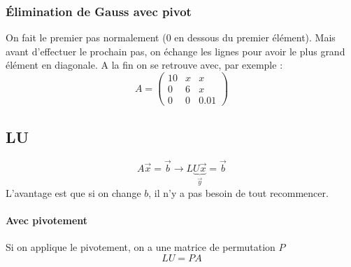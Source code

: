 \documentclass[resume]{subfiles}
\begin{document}
\subsubsection{Élimination de Gauss avec pivot}
On fait le premier pas normalement (0 en dessous du premier élément). Mais avant d'effectuer le prochain pas, on échange les lignes pour avoir le plus grand élément en diagonale. A la fin on se retrouve avec, par exemple :
$$A=\begin{pmatrix}
10 & x & x\\
0 & 6 & x\\
0 & 0 & 0.01
\end{pmatrix}$$
\subsection{LU}
$$A\vec{x}=\vec{b}\longrightarrow L\underbrace{U\vec{x}}_{\vec{y}}=\vec{b}$$
L'avantage est que si on change $b$, il n'y a pas besoin de tout recommencer.
\paragraph{Avec pivotement}
Si on applique le pivotement, on a une matrice de permutation $P$
$$LU=PA$$
\end{document}
